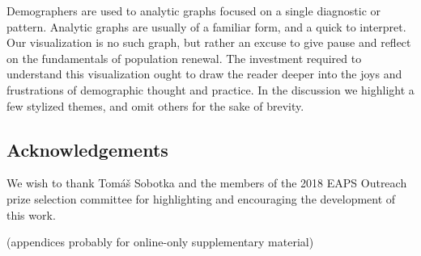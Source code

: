 \documentclass{article}
\begin{document}
Demographers are used to analytic graphs focused on a single diagnostic or pattern. Analytic graphs are usually of a familiar form, and a quick to interpret. Our visualization is no such graph, but rather an excuse to give pause and reflect on the fundamentals of population renewal. The investment required to understand this visualization ought to draw the reader deeper into the joys and frustrations of demographic thought and practice. In the discussion we highlight a few stylized themes, and omit others for the sake of brevity. 

\subsection*{Acknowledgements} We wish to thank Tom\'a\v{s} Sobotka and the members of the 2018 EAPS Outreach prize selection committee for highlighting and encouraging the development of this work.

\FloatBarrier

\pagebreak
\begin{appendix}
(appendices probably for online-only supplementary material)

\end{appendix}
\pagebreak

\theendnotes
\pagebreak

\listoftables
\pagebreak

\listoffigures
\pagebreak

   
\end{document}
